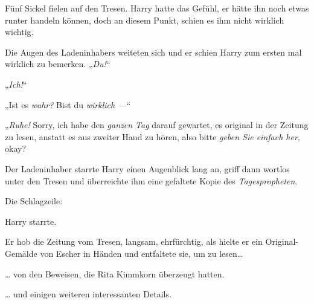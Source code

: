 Fünf Sickel fielen auf den Tresen. Harry hatte das Gefühl, er hätte ihn noch etwas runter handeln können, doch an diesem Punkt, schien es ihm nicht wirklich wichtig.

Die Augen des Ladeninhabers weiteten sich und er schien Harry zum ersten mal wirklich zu bemerken. „\emph{Du!}“

„\emph{Ich!}“

„Ist es \emph{wahr?} Bist du \emph{wirklich —}“

„\emph{Ruhe!} Sorry, ich habe den \emph{ganzen Tag} darauf gewartet, es original in der Zeitung zu lesen, anstatt es aus zweiter Hand zu hören, also bitte \emph{geben Sie einfach her,} okay?

Der Ladeninhaber starrte Harry einen Augenblick lang an, griff dann wortlos unter den Tresen und überreichte ihm eine gefaltete Kopie des \emph{Tagespropheten}.

Die Schlagzeile:


Harry starrte.

Er hob die Zeitung vom Tresen, langsam, ehrfürchtig, als hielte er ein Original-Gemälde von Escher in Händen und entfaltete sie, um zu lesen…

… von den Beweisen, die Rita Kimmkorn überzeugt hatten.

… und einigen weiteren interessanten Details.

